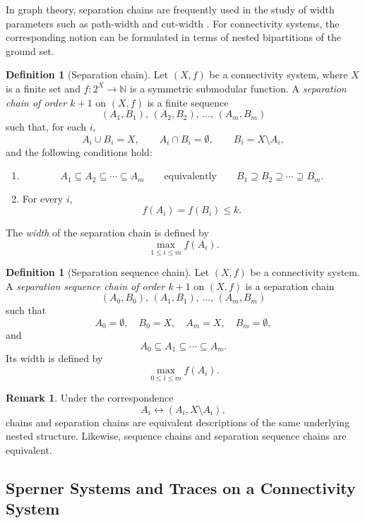 \documentclass[10pt]{book}
\theoremstyle{definition}
\newtheorem{remark}[theorem]{Remark}
\newtheorem{definition}[theorem]{Definition}
\begin{document}
In graph theory, separation chains are frequently used in the study of width parameters such as path-width and cut-width \cite{fomin2019width,pilipczuk2012computing,kitsunai2015pathwidth}.  
For connectivity systems, the corresponding notion can be formulated in terms of nested bipartitions of the ground set.

\begin{definition}[Separation chain]
\label{def:separation_chain_connectivity}
Let \((X,f)\) be a connectivity system, where \(X\) is a finite set and
\(f:2^X\to \mathbb{N}\) is a symmetric submodular function.
A \emph{separation chain of order \(k+1\)} on \((X,f)\) is a finite sequence
\[
(A_1,B_1),\,(A_2,B_2),\,\dots,\,(A_m,B_m)
\]
such that, for each \(i\),
\[
A_i \cup B_i = X,
\qquad
A_i \cap B_i = \emptyset,
\qquad
B_i = X\setminus A_i,
\]
and the following conditions hold:
\begin{enumerate}
    \item
    \[
    A_1 \subseteq A_2 \subseteq \cdots \subseteq A_m
    \qquad\text{equivalently}\qquad
    B_1 \supseteq B_2 \supseteq \cdots \supseteq B_m.
    \]
    \item For every \(i\),
    \[
    f(A_i)=f(B_i)\leq k.
    \]
\end{enumerate}
The \emph{width} of the separation chain is defined by
\[
\max_{1\leq i\leq m} f(A_i).
\]
\end{definition}

\begin{definition}[Separation sequence chain]
\label{def:separation_sequence_chain_connectivity}
Let \((X,f)\) be a connectivity system.
A \emph{separation sequence chain of order \(k+1\)} on \((X,f)\) is a separation chain
\[
(A_0,B_0),\,(A_1,B_1),\,\dots,\,(A_m,B_m)
\]
such that
\[
A_0=\emptyset,\quad B_0=X,\quad A_m=X,\quad B_m=\emptyset,
\]
and
\[
A_0 \subseteq A_1 \subseteq \cdots \subseteq A_m.
\]
Its width is defined by
\[
\max_{0\leq i\leq m} f(A_i).
\]
\end{definition}

\begin{remark}
Under the correspondence
\[
A_i \longleftrightarrow (A_i,X\setminus A_i),
\]
chains and separation chains are equivalent descriptions of the same underlying nested structure.
Likewise, sequence chains and separation sequence chains are equivalent.
\end{remark}

\subsection{Sperner Systems and Traces on a Connectivity System}
\end{document}
